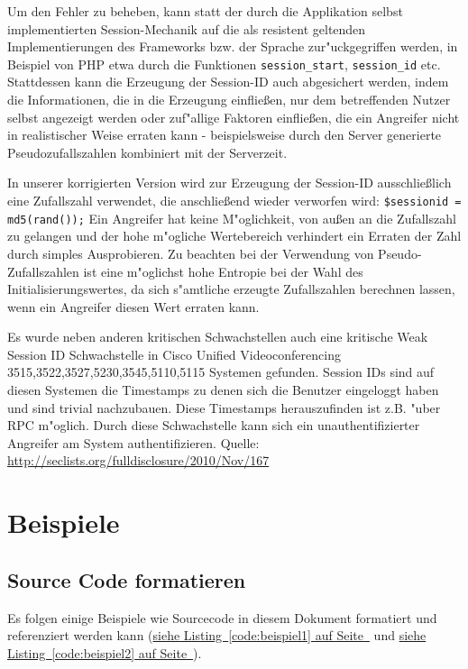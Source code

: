 \documentclass[12pt,a4paper,titlepage,oneside]{scrartcl}
\begin{document}
Um den Fehler zu beheben, kann statt der durch die Applikation selbst implementierten Session-Mechanik auf die als resistent geltenden Implementierungen des Frameworks bzw. der Sprache zur"uckgegriffen werden, in Beispiel von PHP etwa durch die Funktionen \texttt{session\_start}, \texttt{session\_id} etc. Stattdessen kann die Erzeugung der Session-ID auch abgesichert werden, indem die Informationen, die in die Erzeugung einfließen, nur dem betreffenden Nutzer selbst angezeigt werden oder zuf"allige Faktoren einfließen, die ein Angreifer nicht in realistischer Weise erraten kann - beispielsweise durch den Server generierte Pseudozufallszahlen kombiniert mit der Serverzeit. 

In unserer korrigierten Version wird zur Erzeugung der Session-ID ausschließlich eine Zufallszahl verwendet, die anschließend wieder verworfen wird: \lstinline{$sessionid = md5(rand());} Ein Angreifer hat keine M"oglichkeit, von außen an die Zufallszahl zu gelangen und der hohe m"ogliche Wertebereich verhindert ein Erraten der Zahl durch simples Ausprobieren. Zu beachten bei der Verwendung von Pseudo-Zufallszahlen ist eine m"oglichst hohe Entropie bei der Wahl des Initialisierungswertes, da sich s"amtliche erzeugte Zufallszahlen berechnen lassen, wenn ein Angreifer diesen Wert erraten kann.

Es wurde neben anderen kritischen Schwachstellen auch eine kritische Weak Session ID Schwachstelle in Cisco Unified Videoconferencing 3515,3522,3527,5230,3545,5110,5115 Systemen gefunden. Session IDs sind auf diesen Systemen die Timestamps zu denen sich die Benutzer eingeloggt haben und sind trivial nachzubauen. Diese Timestamps herauszufinden ist z.B. "uber RPC m"oglich. Durch diese Schwachstelle kann sich ein unauthentifizierter Angreifer am System authentifizieren.\newline
Quelle: \url{http://seclists.org/fulldisclosure/2010/Nov/167}

\section{Beispiele}

\subsection{Source Code formatieren}
Es folgen einige Beispiele wie Sourcecode in diesem Dokument formatiert und referenziert werden kann
(\hyperref[code:beispiel1]{siehe Listing~\ref*{code:beispiel1} auf Seite~\pageref*{code:beispiel1}} und \hyperref[code:beispiel2]{siehe Listing~\ref*{code:beispiel2} auf Seite~\pageref*{code:beispiel2}}).
\end{document}
